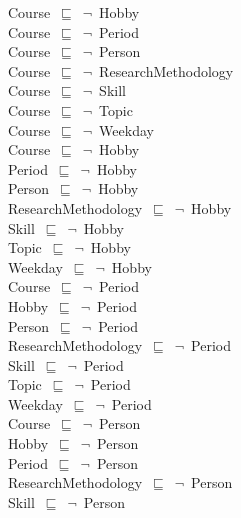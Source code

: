 \documentclass{article}
\begin{document}
Course~\ensuremath{\sqsubseteq}~\ensuremath{\lnot}~Hobby\\
Course~\ensuremath{\sqsubseteq}~\ensuremath{\lnot}~Period\\
Course~\ensuremath{\sqsubseteq}~\ensuremath{\lnot}~Person\\
Course~\ensuremath{\sqsubseteq}~\ensuremath{\lnot}~ResearchMethodology\\
Course~\ensuremath{\sqsubseteq}~\ensuremath{\lnot}~Skill\\
Course~\ensuremath{\sqsubseteq}~\ensuremath{\lnot}~Topic\\
Course~\ensuremath{\sqsubseteq}~\ensuremath{\lnot}~Weekday\\
Course~\ensuremath{\sqsubseteq}~\ensuremath{\lnot}~Hobby\\
Period~\ensuremath{\sqsubseteq}~\ensuremath{\lnot}~Hobby\\
Person~\ensuremath{\sqsubseteq}~\ensuremath{\lnot}~Hobby\\
ResearchMethodology~\ensuremath{\sqsubseteq}~\ensuremath{\lnot}~Hobby\\
Skill~\ensuremath{\sqsubseteq}~\ensuremath{\lnot}~Hobby\\
Topic~\ensuremath{\sqsubseteq}~\ensuremath{\lnot}~Hobby\\
Weekday~\ensuremath{\sqsubseteq}~\ensuremath{\lnot}~Hobby\\
Course~\ensuremath{\sqsubseteq}~\ensuremath{\lnot}~Period\\
Hobby~\ensuremath{\sqsubseteq}~\ensuremath{\lnot}~Period\\
Person~\ensuremath{\sqsubseteq}~\ensuremath{\lnot}~Period\\
ResearchMethodology~\ensuremath{\sqsubseteq}~\ensuremath{\lnot}~Period\\
Skill~\ensuremath{\sqsubseteq}~\ensuremath{\lnot}~Period\\
Topic~\ensuremath{\sqsubseteq}~\ensuremath{\lnot}~Period\\
Weekday~\ensuremath{\sqsubseteq}~\ensuremath{\lnot}~Period\\
Course~\ensuremath{\sqsubseteq}~\ensuremath{\lnot}~Person\\
Hobby~\ensuremath{\sqsubseteq}~\ensuremath{\lnot}~Person\\
Period~\ensuremath{\sqsubseteq}~\ensuremath{\lnot}~Person\\
ResearchMethodology~\ensuremath{\sqsubseteq}~\ensuremath{\lnot}~Person\\
Skill~\ensuremath{\sqsubseteq}~\ensuremath{\lnot}~Person\\
\end{document}
